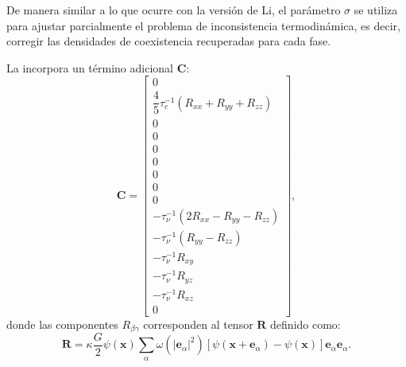 De manera similar a lo que ocurre con la versi\'on de Li, el par\'ametro $\sigma$ se utiliza para ajustar parcialmente el problema de inconsistencia termodin\'amica, es decir, corregir las densidades de coexistencia recuperadas para cada fase. 

La  incorpora un t\'ermino adicional $\bm{C}$:
\begin{equation}
 \bm{C} = 
 \left[ 
 	\begin{array}{c} 
 		0	\\
 		\dfrac{4}{5} \tau_{e}^{-1}(R_{xx} + R_{yy} + R_{zz}) \\
 		0 \\
 		0 \\
 		0 \\
 		0 \\
 		0 \\
 		0 \\
 		0 \\ 		
		-\tau_{\nu}^{-1}(2R_{xx} - R_{yy} - R_{zz}) \\
		-\tau_{\nu}^{-1}(R_{yy} - R_{zz}) \\
		-\tau_{\nu}^{-1}R_{xy} \\
		-\tau_{\nu}^{-1}R_{yz} \\
		-\tau_{\nu}^{-1}R_{xz} \\
		0
 	\end{array} 
 \right],
 \label{eq:c_xu}
\end{equation}
\FloatBarrier
donde las componentes $R_{\beta\gamma}$ corresponden al tensor $\bm{R}$ definido como:
\begin{equation}
 \bm{R} = \kappa \dfrac{G}{2} \psi(\bm{x}) \sum_{\alpha} \omega(|\bm{e}_{\alpha}|^2) \left[ \psi(\bm{x}+\bm{e}_{\alpha}) - \psi(\bm{x}) \right] \bm{e}_{\alpha}\bm{e}_{\alpha}.
	\label{eq:R_xu}
\end{equation}

